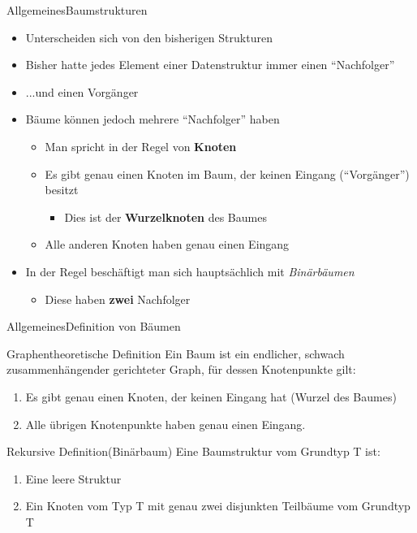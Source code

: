 \begin{frame}{Allgemeines}{Baumstrukturen}
	\begin{itemize}
		\item Unterscheiden sich von den bisherigen Strukturen
		\item Bisher hatte jedes Element einer Datenstruktur immer einen "`Nachfolger"'
		\item ...und einen Vorgänger
		\item Bäume können jedoch mehrere "`Nachfolger"' haben
		\begin{itemize}
			\item Man spricht in der Regel von \textbf{Knoten}
			\item Es gibt genau einen Knoten im Baum, der keinen Eingang ("`Vorgänger"') besitzt
			\begin{itemize}
				\item Dies ist der \textbf{Wurzelknoten} des Baumes
			\end{itemize}
			\item Alle anderen Knoten haben genau einen Eingang
		\end{itemize}
		\item In der Regel beschäftigt man sich hauptsächlich mit \textit{Binärbäumen}
		\begin{itemize}
			\item Diese haben \textbf{zwei} Nachfolger
		\end{itemize}
	\end{itemize}
\end{frame}

\begin{frame}{Allgemeines}{Definition von Bäumen}
	\begin{alertblock}{Graphentheoretische Definition}
	Ein Baum ist ein endlicher, schwach zusammenhängender gerichteter Graph, für dessen Knotenpunkte gilt:
	\begin{enumerate}
		\item Es gibt genau einen Knoten, der keinen Eingang hat (Wurzel des Baumes)
		\item Alle übrigen Knotenpunkte haben genau einen Eingang.
	\end{enumerate}
	\end{alertblock}
	
	\begin{alertblock}{Rekursive Definition(Binärbaum)}
	Eine Baumstruktur vom Grundtyp T ist:
	\begin{enumerate}
		\item Eine leere Struktur
		\item Ein Knoten vom Typ T mit genau zwei disjunkten Teilbäume vom Grundtyp T
	\end{enumerate}
	\end{alertblock}
\end{frame}

